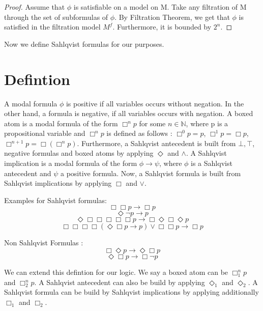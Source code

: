 \documentclass[12pt, a4paper]{scrreprt}
\begin{document}
\begin{proof}
Assume that $\phi$ is satisfiable on a model on M. Take any filtration of M through the set of subformulas of $\phi$. 
By Filtration Theorem, we get that $\phi$ is satisfied in the filtration model $M^f$. Furthermore, it is bounded by $2^n$.

\end{proof}

Now we define Sahlqvist formulas for our purposes.
\section{Defintion}

A modal formula $\phi$ is positive if all variables occurs without negation. In the other hand, a formula is negative, if all variables occurs with negation.
A boxed atom is a modal formula of the form $\Box^n p$ for some $n \in \mathbb{N}$, where p is a propositional variable and $\Box^n p$ is defined as follows :
$\Box^0 p = p$, $\Box^1 p = \Box p$, $\Box^{n+1} p = \Box(\Box^n p)$. \newline \newline
Furthermore, a Sahlqvist antecedent is built from $\bot, \top$, negative formulas and boxed atoms by applying $\Diamond$ and $\land$. A Sahlqvist implication is a modal formula of the form
$\phi \rightarrow \psi$, where $\phi$ is a Sahlqvist antecedent and $\psi$ a positive formula. \newline
Now, a Sahlqvist formula is built from Sahlqvist implications by applying $\Box$ and $\lor$. \newline

Examples for Sahlqvist formulas: 
$$\Box \Box p \rightarrow \Box p$$
$$ \Diamond \neg p\rightarrow p$$
$$ \Diamond \Box \Box \Box \Box \Box p\rightarrow \Box \Diamond \Box \Diamond p$$
$$ \Box\Box\Box\Box(\Diamond \Box p\rightarrow p) \lor \Box \Box p \rightarrow \Box p $$

Non Sahlqvist Formulas :
$$\Box \Diamond p \rightarrow \Diamond \Box p$$
$$\Diamond \Box p \rightarrow \Box \neg p$$ \newline

We can extend this defintion for our logic. We say a boxed atom can be $\Box^n_1 p$ and $\Box^n_2 p$. A Sahlqvist antecedent
can also be build by applying $\Diamond_1$ and $\Diamond_2$. A Sahlqvist formula can be build by
Sahlqvist implications by applying additionally $\Box_1$ and $\Box_2$.  \newline
\end{document}

